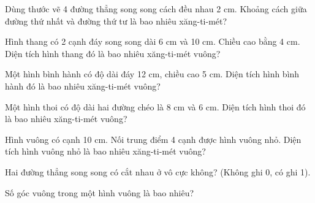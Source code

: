 \begin{ex}
Dùng thước vẽ 4 đường thẳng song song cách đều nhau 2 cm. Khoảng cách giữa đường thứ nhất và đường thứ tư là bao nhiêu xăng-ti-mét?
\end{ex}

\begin{ex}
Hình thang có 2 cạnh đáy song song dài 6 cm và 10 cm. Chiều cao bằng 4 cm. Diện tích hình thang đó là bao nhiêu xăng-ti-mét vuông?
\end{ex}

\begin{ex}
Một hình bình hành có độ dài đáy 12 cm, chiều cao 5 cm. Diện tích hình bình hành đó là bao nhiêu xăng-ti-mét vuông?
\end{ex}

\begin{ex}
Một hình thoi có độ dài hai đường chéo là 8 cm và 6 cm. Diện tích hình thoi đó là bao nhiêu xăng-ti-mét vuông?
\end{ex}

\begin{ex}
Hình vuông có cạnh 10 cm. Nối trung điểm 4 cạnh được hình vuông nhỏ. Diện tích hình vuông nhỏ là bao nhiêu xăng-ti-mét vuông?
\end{ex}

\begin{ex}
Hai đường thẳng song song có cắt nhau ở vô cực không? (Không ghi 0, có ghi 1).
\end{ex}

\begin{ex}
Số góc vuông trong một hình vuông là bao nhiêu?
\end{ex}
